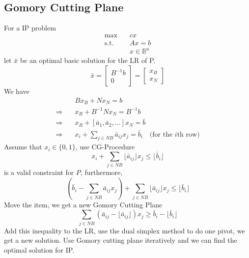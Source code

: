 			\subsection{Gomory Cutting Plane}
				For a IP problem
				\begin{align}
					\max \quad & cx  \\
					\text{s.t.} \quad & Ax=b  \\
						& x \in \mathbb{B}^n 
				\end{align}
				let $\bar{x}$ be an optimal basic solution for the LR of P.
				\begin{equation}
					\bar{x} = \left[\begin{matrix} B^{-1}b \\ 0 \end{matrix}\right] = \left[ \begin{matrix}x_B \\ x_N\end{matrix}\right] 
				\end{equation}
				We have
				\begin{align}
					& Bx_B + Nx_N = b \\
					\Rightarrow \quad & x_B + B^{-1}Nx_N=B^{-1}b  \\
					\Rightarrow \quad & x_B + [\bar{a}_1, \bar{a}_2, ...]x_N = \bar{b} \\
					\Rightarrow \quad & x_i + \sum_{j\in NB} \bar{a}_{ij}x_j = \bar{b}_i \quad \text{(for the $i$th row)} 
				\end{align}
				Assume that $x_i \in \{0, 1\}$, use CG-Procedure
				\begin{equation}
					x_i + \sum_{j \in NB} \lfloor \bar{a}_{ij} \rfloor x_j \le \lfloor \bar{b}_i \rfloor 
				\end{equation}
				is a valid constraint for $P$, furthermore,
				\begin{equation}
					(\bar{b}_i - \sum_{j\in NB} \bar{a}_{ij}x_j) + \sum_{j\in NB}\lfloor \bar{a}_{ij} \rfloor x_j\le \lfloor \bar{b}_i \rfloor 
				\end{equation}
				Move the item, we get a new Gomory Cutting Plane
				\begin{equation}
					\sum_{j\in NB} (\bar{a}_{ij} - \lfloor \bar{a}_{ij} \rfloor)x_j \ge \bar{b}_i - \lfloor \bar{b}_i \rfloor  
				\end{equation}
				Add this inequality to the LR, use the dual simplex method to do one pivot, we get a new solution. Use Gomory cutting plane iteratively and we can find the optimal solution for IP.


